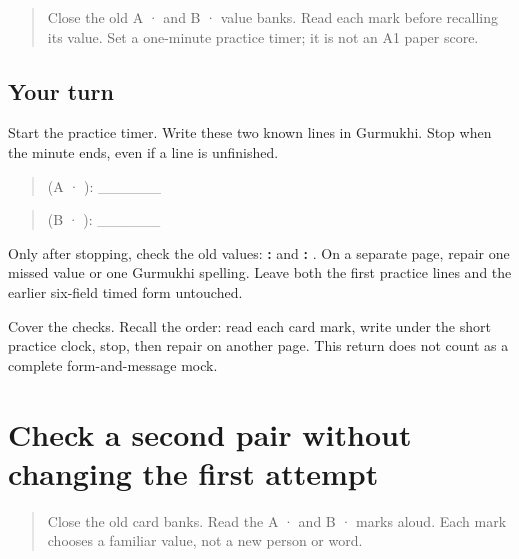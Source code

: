 \label{lesson:PA-W13-form-clock-return}



\begin{quote}
Close the old A ·  and B ·  value banks. Read each mark before recalling its value. Set a one-minute practice timer; it is not an A1 paper score.
\end{quote}

\subsection*{Your turn}
Start the practice timer. Write these two known lines in Gurmukhi. Stop when the minute ends, even if a line is unfinished.

\begin{quote}
 (A · ): \_\_\_\_\_\_
\end{quote}

\begin{quote}
 (B · ): \_\_\_\_\_\_
\end{quote}

Only after stopping, check the old values: \textbf{: } and \textbf{: }. On a separate page, repair one missed value or one Gurmukhi spelling. Leave both the first practice lines and the earlier six-field timed form untouched.

\begin{tcolorbox}[breakable,colback=teal!4,colframe=teal!35!black,title={Before you move on}]
Cover the checks. Recall the order: read each card mark, write under the short practice clock, stop, then repair on another page. This return does not count as a complete form-and-message mock.
\end{tcolorbox}
\section[\texorpdfstring{\pa{ਰਿਹਾਇਸ਼}: · \pa{ਕੰਮ}: (a second small …)}{ਰਿਹਾਇਸ਼: · ਕੰਮ: (a second small …)}]{Check a second pair without changing the first attempt}

\label{lesson:PA-W13-repair-check-return}



\begin{quote}
Close the old card banks. Read the A ·  and B ·  marks aloud. Each mark chooses a familiar value, not a new person or word.
\end{quote}


